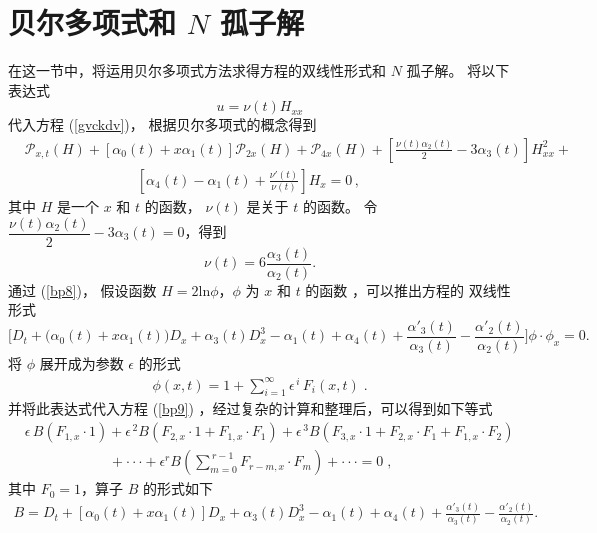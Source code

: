 \section{贝尔多项式和 $N$ 孤子解}
在这一节中，将运用贝尔多项式方法求得方程的双线性形式和 $N$ 孤子解。
将以下表达式
\begin{equation}
u=\nu(t) H_{xx}
\end{equation}
代入方程 (\ref{gvckdv})， 根据贝尔多项式的概念得到
\begin{align}
\nonumber
&  \mathcal{P}_{x,t}(H) + [\alpha _0(t)+x \alpha _1(t)]\mathcal{P}_{2x}(H) +
 \mathcal{P}_{4x}(H) +[\frac{\nu(t)\alpha _2(t)}{2} - 3  \alpha _3(t) ]H^2_{xx} +
\\ & \qquad \qquad \qquad \qquad
[\alpha _4(t)-\alpha _1(t) + \frac{\nu'(t)}{\nu(t)}]H_x=0\,,\label{bp8}
\end{align}
其中 $H$ 是一个 $x$ 和 $t$ 的函数， $\nu(t)$ 是关于 $t$ 的函数。
令 $\dfrac{\nu(t)\alpha _2(t)}{2} - 3  \alpha _3(t)=0$，得到
\begin{equation}
\nu(t)=6 \frac{\alpha _3(t)}{\alpha _2(t)}.
\end{equation}
通过 (\ref{bp8})， 假设函数 $H=2\text{ln}\phi$，$\phi$ 为 $x$ 和 $t$ 的函数 ，可以推出方程的
双线性形式
\begin{equation}
\Big [ D_t+  \big(\alpha _0(t)+x \alpha _1(t)\big)D_x +
\alpha_3(t)D_x^3 - \alpha _1(t)+ \alpha _4(t)+\frac{\alpha' _3(t)}{\alpha _3(t)}
-\frac{\alpha' _2(t)}{\alpha _2(t)} \Big ]\phi \cdot \phi _x=0.\label{bp9}
\end{equation}
将 $\phi$ 展开成为参数 $ \epsilon $ 的形式
\begin{eqnarray}
\phi(x,t)=1+\sum_{i = 1}^{\infty}
\epsilon^{\,i}\,F_{i}(x,t)\;. \label{b2}
\end{eqnarray}
并将此表达式代入方程 (\ref{bp9}) ，经过复杂的计算和整理后，可以得到如下等式
\begin{eqnarray}
 &\nonumber \epsilon\, B(F_{1,x}\cdot 1)+\epsilon^{\,2}
B(F_{2,x}\cdot 1+F_{1,x} \cdot F_{1})+\epsilon^{\,3}
B(F_{3,x}\cdot 1+F_{2,x}\cdot F_{1}+F_{1,x}\cdot F_{2})
\\&\qquad\qquad\qquad +\cdot\cdot\cdot +\epsilon^{r}B(\sum_{m = 0}^{\,r-1}
    F_{r-m,x}\cdot
F_{m})+\cdot\cdot\cdot=0\;, \label{kdv-262}
\end{eqnarray}
其中 $F_{0}=1$，算子 $B$ 的形式如下
\begin{eqnarray}
B=D_t+\left[\alpha _0(t)+x \alpha _1(t)\right]D_x +
\alpha_3(t)D_x^3 - \alpha _1(t)+ \alpha _4(t)+\frac{\alpha' _3(t)}{\alpha _3(t)}
-\frac{\alpha' _2(t)}{\alpha _2(t)}.\label{kdv-263}
\end{eqnarray}
